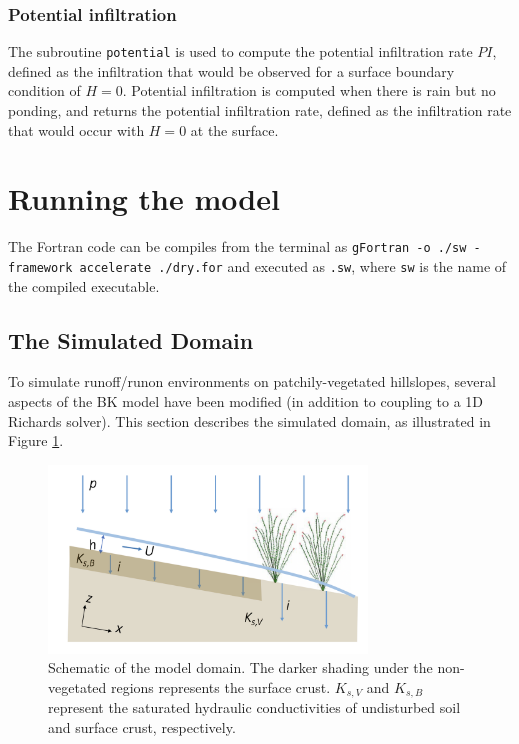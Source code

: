 \documentclass{article}
\newcommand{\code}[1]{\texttt{#1}}
\begin{document}
\subsubsection*{Potential infiltration}

The subroutine \code{potential} is used to compute the potential infiltration rate $PI$, defined as the infiltration that would be observed for a surface boundary condition of $H=0$. 
Potential infiltration is computed when there is rain but no ponding, and returns the potential infiltration rate, defined as the infiltration rate that would occur with $H=0$ at the surface.  

 
\section{Running the model}

The Fortran code can be compiles from the terminal as
    \code{gFortran -o ./sw  -framework accelerate ./dry.for}
and executed as \code{.sw}, where \code{sw} is the name of the compiled executable.
  


\subsection{The Simulated Domain}

To simulate runoff/runon environments on patchily-vegetated hillslopes, several aspects of the BK model have been modified (in addition to coupling to a 1D Richards solver).  This section describes the simulated domain, as illustrated in Figure \ref{domain_schematic}.

 \begin{figure}[h]
 \centering
\includegraphics[width=20pc]{grid/domain_schematic.png}
 \caption{Schematic of the model domain.  The darker shading under the non-vegetated regions represents the surface crust.  $K_{s,V}$ and $K_{s,B}$  represent the saturated hydraulic conductivities of undisturbed soil and surface crust, respectively.}
 \label{domain_schematic}
 \end{figure}
 
\end{document}
